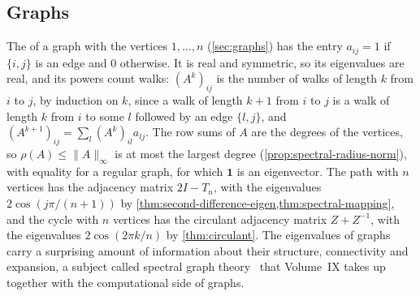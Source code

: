\subsection{Graphs}

The  of a graph with the vertices $1,\ldots,n$ (\cref{sec:graphs}) has the entry $a_{ij}=1$ if $\{i,j\}$ is an edge and $0$ otherwise. It is real and symmetric, so its eigenvalues are real, and its powers count walks: $(A^k)_{ij}$ is the number of walks of length $k$ from $i$ to $j$, by induction on $k$, since a walk of length $k+1$ from $i$ to $j$ is a walk of length $k$ from $i$ to some $l$ followed by an edge $\{l,j\}$, and $(A^{k+1})_{ij}=\sum_l(A^k)_{il}a_{lj}$. The row sums of $A$ are the degrees of the vertices, so $\rho(A)\le\|A\|_\infty$ is at most the largest degree (\cref{prop:spectral-radius-norm}), with equality for a regular graph, for which $\mathbf 1$ is an eigenvector. The path with $n$ vertices has the adjacency matrix $2I-T_n$, with the eigenvalues $2\cos(j\pi/(n+1))$ by \cref{thm:second-difference-eigen,thm:spectral-mapping}, and the cycle with $n$ vertices has the circulant adjacency matrix $Z+Z^{-1}$, with the eigenvalues $2\cos(2\pi k/n)$ by \cref{thm:circulant}. The eigenvalues of graphs carry a surprising amount of information about their structure, connectivity and expansion, a subject called spectral graph theory~\cite{biggs1993,godsil2001} that Volume~IX takes up together with the computational side of graphs.

\begin{table}
\end{table}

